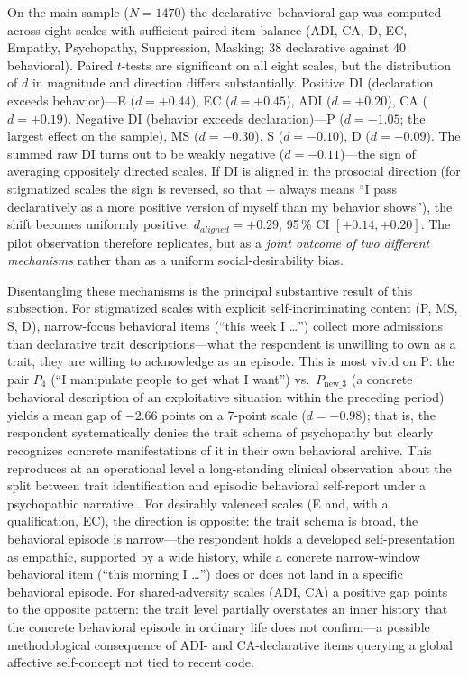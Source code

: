 On the main sample ($N{=}1470$) the declarative--behavioral gap was computed across eight scales with sufficient paired-item balance (ADI, CA, D, EC, Empathy, Psychopathy, Suppression, Masking; 38 declarative against 40 behavioral). Paired $t$-tests are significant on all eight scales, but the distribution of $d$ in magnitude and direction differs substantially. Positive DI (declaration exceeds behavior)---E ($d{=}{+}0.44$), EC ($d{=}{+}0.45$), ADI ($d{=}{+}0.20$), CA ($d{=}{+}0.19$). Negative DI (behavior exceeds declaration)---P ($d{=}{-}1.05$; the largest effect on the sample), MS ($d{=}{-}0.30$), S ($d{=}{-}0.10$), D ($d{=}{-}0.09$). The summed raw DI turns out to be weakly negative ($d{=}{-}0.11$)---the sign of averaging oppositely directed scales. If DI is aligned in the prosocial direction (for stigmatized scales the sign is reversed, so that $+$ always means ``I pass declaratively as a more positive version of myself than my behavior shows''), the shift becomes uniformly positive: $d_{aligned}{=}{+}0.29$, 95\,\% CI $[{+}0.14, {+}0.20]$. The pilot observation therefore replicates, but as a \emph{joint outcome of two different mechanisms} rather than as a uniform social-desirability bias.

Disentangling these mechanisms is the principal substantive result of this subsection. For stigmatized scales with explicit self-incriminating content (P, MS, S, D), narrow-focus behavioral items (``this week I \ldots'') collect more admissions than declarative trait descriptions---what the respondent is unwilling to own as a trait, they are willing to acknowledge as an episode. This is most vivid on P: the pair $P_4$ (``I manipulate people to get what I want'') vs.\ $P_{\text{new\_3}}$ (a concrete behavioral description of an exploitative situation within the preceding period) yields a mean gap of $-2.66$ points on a 7-point scale ($d{=}{-}0.98$); that is, the respondent systematically denies the trait schema of psychopathy but clearly recognizes concrete manifestations of it in their own behavioral archive. This reproduces at an operational level a long-standing clinical observation about the split between trait identification and episodic behavioral self-report under a psychopathic narrative \citep{hare2003, lilienfeld1990}. For desirably valenced scales (E and, with a qualification, EC), the direction is opposite: the trait schema is broad, the behavioral episode is narrow---the respondent holds a developed self-presentation as empathic, supported by a wide history, while a concrete narrow-window behavioral item (``this morning I \ldots'') does or does not land in a specific behavioral episode. For shared-adversity scales (ADI, CA) a positive gap points to the opposite pattern: the trait level partially overstates an inner history that the concrete behavioral episode in ordinary life does not confirm---a possible methodological consequence of ADI- and CA-declarative items querying a global affective self-concept not tied to recent code.

